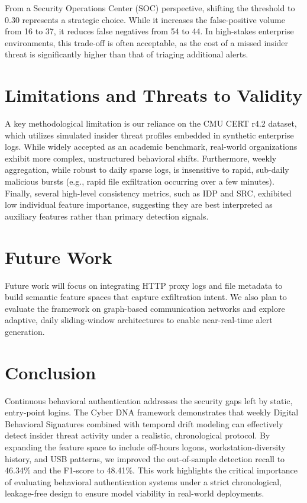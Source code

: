 \documentclass[pdflatex,sn-mathphys-num]{sn-jnl}
\theoremstyle{thmstyleone}
\theoremstyle{thmstyletwo}
\theoremstyle{thmstylethree}
\begin{document}
From a Security Operations Center (SOC) perspective, shifting the threshold to 0.30 represents a strategic choice. While it increases the false-positive volume from 16 to 37, it reduces false negatives from 54 to 44. In high-stakes enterprise environments, this trade-off is often acceptable, as the cost of a missed insider threat is significantly higher than that of triaging additional alerts.

\section{Limitations and Threats to Validity}\label{sec7}
A key methodological limitation is our reliance on the CMU CERT r4.2 dataset, which utilizes simulated insider threat profiles embedded in synthetic enterprise logs. While widely accepted as an academic benchmark, real-world organizations exhibit more complex, unstructured behavioral shifts. Furthermore, weekly aggregation, while robust to daily sparse logs, is insensitive to rapid, sub-daily malicious bursts (e.g., rapid file exfiltration occurring over a few minutes). Finally, several high-level consistency metrics, such as IDP and SRC, exhibited low individual feature importance, suggesting they are best interpreted as auxiliary features rather than primary detection signals.

\section{Future Work}\label{sec8}
Future work will focus on integrating HTTP proxy logs and file metadata to build semantic feature spaces that capture exfiltration intent. We also plan to evaluate the framework on graph-based communication networks and explore adaptive, daily sliding-window architectures to enable near-real-time alert generation.

\section{Conclusion}\label{sec9}
Continuous behavioral authentication addresses the security gaps left by static, entry-point logins. The Cyber DNA framework demonstrates that weekly Digital Behavioral Signatures combined with temporal drift modeling can effectively detect insider threat activity under a realistic, chronological protocol. By expanding the feature space to include off-hours logons, workstation-diversity history, and USB patterns, we improved the out-of-sample detection recall to 46.34\% and the F1-score to 48.41\%. This work highlights the critical importance of evaluating behavioral authentication systems under a strict chronological, leakage-free design to ensure model viability in real-world deployments.
\end{document}
